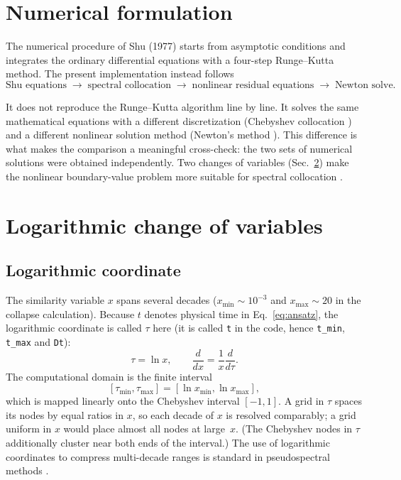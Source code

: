 \documentclass[11pt,a4paper]{article}
\begin{document}
\section{Numerical formulation}\label{sec:numfor}

The numerical procedure of Shu (1977) starts from asymptotic conditions
and integrates the ordinary differential equations with a four-step
Runge--Kutta method. The present implementation instead follows
\begin{equation}
\boxed{
\text{Shu equations}
\;\longrightarrow\;
\text{spectral collocation}
\;\longrightarrow\;
\text{nonlinear residual equations}
\;\longrightarrow\;
\text{Newton solve}.
}
\label{eq:pipeline}
\end{equation}

It does not reproduce the Runge--Kutta algorithm line by line. It solves
the same mathematical equations with a different discretization
(Chebyshev collocation \cite{trefethen2000,boyd2001}) and a
different nonlinear solution method (Newton's method
\cite{dennis1996}). This difference is what makes the comparison a
meaningful cross-check: the two sets of numerical solutions were obtained
independently. Two changes of variables (Sec.~\ref{sec:logvars}) make the
nonlinear boundary-value problem more suitable for spectral collocation
\cite{boyd2001}.

\section{Logarithmic change of variables}\label{sec:logvars}

\subsection{Logarithmic coordinate}

The similarity variable $x$ spans several decades
($x_{\min}\sim10^{-3}$ and $x_{\max}\sim20$ in the collapse calculation).
Because $t$ denotes physical time in Eq.~\eqref{eq:ansatz}, the
logarithmic coordinate is called $\tau$ here (it is called \texttt{t} in
the code, hence \texttt{t\_min}, \texttt{t\_max} and \texttt{Dt}):
\begin{equation}
\tau=\ln x,
\qquad
\frac{d}{dx}=\frac{1}{x}\frac{d}{d\tau}.
\label{eq:logcoord}
\end{equation}
The computational domain is the finite interval
\[
[\tau_{\min},\tau_{\max}]
=
[\ln x_{\min},\ln x_{\max}],
\]
which is mapped linearly onto the Chebyshev interval $[-1,1]$. A grid in
$\tau$ spaces its nodes by equal ratios in $x$, so each decade of $x$ is
resolved comparably; a grid uniform in $x$ would place almost all nodes at
large~$x$. (The Chebyshev nodes in $\tau$ additionally cluster near both
ends of the interval.) The use of logarithmic coordinates to compress
multi-decade ranges is standard in pseudospectral methods
\cite{boyd2001}.
\end{document}
